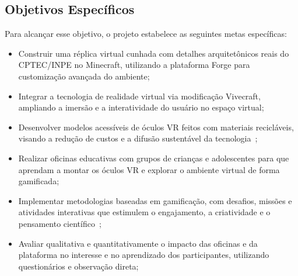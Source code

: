 \subsection{Objetivos Específicos}
Para alcançar esse objetivo, o projeto estabelece as seguintes metas específicas:  
\begin{itemize}
  \item Construir uma réplica virtual cunhada com detalhes arquitetônicos reais do CPTEC/INPE no Minecraft, utilizando a plataforma Forge para customização avançada do ambiente;  
  \item Integrar a tecnologia de realidade virtual via modificação Vivecraft, ampliando a imersão e a interatividade do usuário no espaço virtual;  
  \item Desenvolver modelos acessíveis de óculos VR feitos com materiais recicláveis, visando a redução de custos e a difusão sustentável da tecnologia~\cite{cardboard2014,araujo2016};  
  \item Realizar oficinas educativas com grupos de crianças e adolescentes para que aprendam a montar os óculos VR e explorar o ambiente virtual de forma gamificada;  
  \item Implementar metodologias baseadas em gamificação, com desafios, missões e atividades interativas que estimulem o engajamento, a criatividade e o pensamento científico~\cite{santos2022};  
  \item Avaliar qualitativa e quantitativamente o impacto das oficinas e da plataforma no interesse e no aprendizado dos participantes, utilizando questionários e observação direta;  
\end{itemize}
